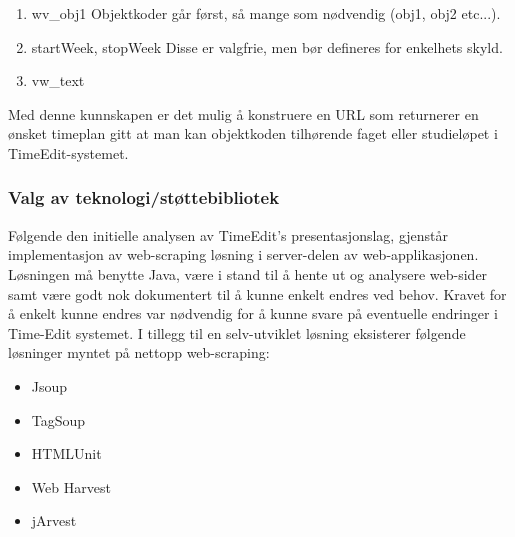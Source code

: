 \documentclass[../main.tex]{subfiles}
\begin{document}
\begin{enumerate}
\item wv\_obj1
Objektkoder går først, så mange som nødvendig (obj1, obj2 etc...).
\item startWeek, stopWeek
Disse er valgfrie, men bør defineres for enkelhets skyld.
\item vw\_text
\end{enumerate}

Med denne kunnskapen er det mulig å konstruere en URL som returnerer en ønsket timeplan gitt at man kan objektkoden tilhørende faget eller studieløpet i TimeEdit-systemet. 

\subsubsection{Valg av teknologi/støttebibliotek}

Følgende den initielle analysen av TimeEdit’s presentasjonslag, gjenstår implementasjon av web-scraping løsning i server-delen av web-applikasjonen.  Løsningen må benytte Java, være i stand til å hente ut og analysere web-sider samt være godt nok dokumentert til å kunne enkelt endres ved behov. Kravet for å enkelt kunne endres var nødvendig for å kunne svare på eventuelle endringer i Time-Edit systemet.
I tillegg til en selv-utviklet løsning eksisterer følgende løsninger myntet på nettopp web-scraping:

\begin{itemize}
\item Jsoup 
\item TagSoup 
\item HTMLUnit 
\item Web Harvest 
\item jArvest 
\end{itemize}
\end{document}

